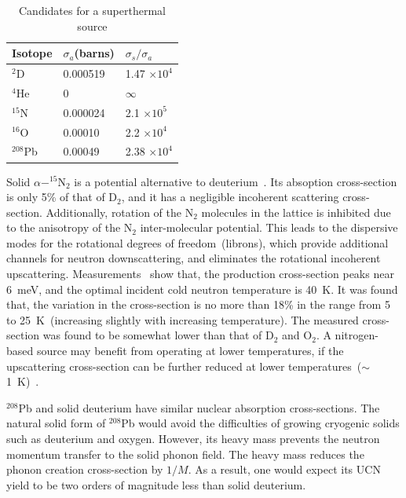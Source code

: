 \begin{table}
\begin{center}
\begin{tabular}{|l|l|l|}
\hline
Isotope & $\sigma_a$(barns) & $\sigma_s / \sigma_a$  \\
\hline
$^2$D & 0.000519 & 1.47 $\times 10^4$ \\
\hline
$^4$He & 0 & $\infty$ \\
\hline
$^{15}$N & 0.000024 & 2.1 $\times 10^5$ \\
\hline
$^{16}$O & 0.00010 & 2.2 $\times 10^4$ \\
\hline
$^{208}$Pb & 0.00049 &  2.38 $\times 10^4$\\
\hline
\end{tabular}
\end{center}
\caption{Candidates for a superthermal source\label{tab:other_sources}}
\end{table}

Solid $\alpha - ^{15}$N$_2$ is a potential alternative to
deuterium~\cite{Salvat2013}. Its absoption cross-section is only 5\%
of that of D$_2$, and it has a negligible incoherent scattering
cross-section. Additionally, rotation of the N$_2$ molecules in the
lattice is inhibited due to the anisotropy of the N$_2$
inter-molecular potential. This leads to the dispersive modes for the
rotational degrees of freedom~(librons), which provide additional
channels for neutron downscattering, and eliminates the rotational
incoherent upscattering. Measurements~\cite{Salvat2013} show that, the
production cross-section peaks near 6~meV, and the optimal incident
cold neutron temperature is 40~K. It was found that, the variation in
the cross-section is no more than 18\% in the range from 5 to
25~K~(increasing slightly with increasing temperature). The measured
cross-section was found to be somewhat lower than that of D$_2$ and
O$_2$.
A nitrogen-based source may benefit from operating at lower
temperatures, if the upscattering cross-section can be further reduced
at lower temperatures~($\sim$1~K)~\cite{Salvat2013}.


$^{208}$Pb and solid deuterium have similar nuclear absorption
cross-sections. The natural solid form of $^{208}$Pb would avoid the
difficulties of growing cryogenic solids such as deuterium and
oxygen. However, its heavy mass prevents the neutron momentum transfer
to the solid phonon field. The heavy mass reduces the phonon creation
cross-section by $1/M$. As a result, one would expect its UCN yield to
be two orders of magnitude less than solid deuterium.

